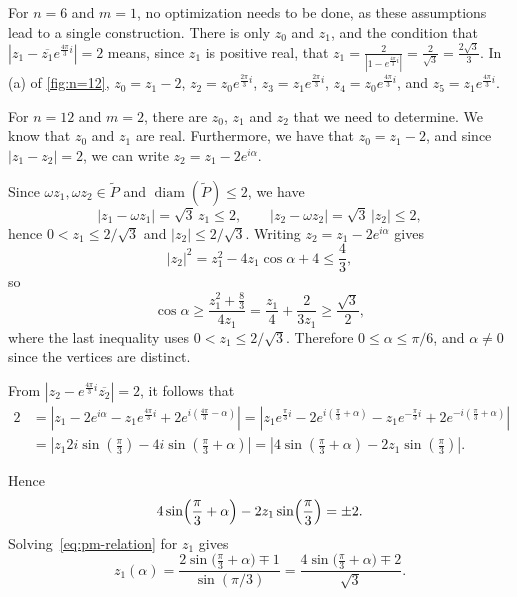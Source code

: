 \documentclass{article}
\DeclareMathOperator{\diam}{diam}
\theoremstyle{definition}
\let\le\leqslant
\let\ge\geqslant
\begin{document}
For \(n=6\) and \(m=1\), no optimization needs to be done, as these assumptions lead to a single construction.
There is only \(z_0\) and \(z_1\), and the condition that \(|z_1-\overline{z_1} e^{\frac{4\pi}3 i}|=2\) means, since \(z_1\) is positive real, that \(z_1= \frac{2}{|1-e^{\frac{4\pi}3 i}|}=\frac{2}{\sqrt{3}} =\frac{2\sqrt{3}}{3}\).
In (a) of \cref{fig:n=12}, \(z_0= z_1-2 \), \(z_2=z_0 e^{\frac{2\pi}3 i}\), \(z_3=z_1 e^{\frac{2\pi}3 i}\), \(z_4=z_0 e^{\frac{4\pi}3 i}\), and \(z_5=z_1 e^{\frac{4\pi}3 i}\).


For \(n=12\) and \(m=2\), there are \(z_0\), \(z_1\) and \(z_2\) that we need to determine.
We know that \(z_0\) and \(z_1\) are real.
Furthermore, we have that \(z_0=z_1-2\), and since \(|z_1-z_2|=2\), we can write \(z_2=z_1 - 2 e^{i\alpha}\).


Since $\omega z_1,\omega z_2\in\widetilde P$ and $\diam(\widetilde P)\le 2$, we have
\[
|z_1-\omega z_1|=\sqrt3\,z_1\le 2,\qquad |z_2-\omega z_2|=\sqrt3\,|z_2|\le 2,
\]
hence $0<z_1\le 2/\sqrt3$ and $|z_2|\le 2/\sqrt3$.
Writing $z_2=z_1-2e^{i\alpha}$ gives
\[
|z_2|^2=z_1^2-4z_1\cos\alpha+4\le \frac{4}{3},
\]
so
\[
\cos\alpha \ge \frac{z_1^2+\frac{8}{3}}{4z_1}=\frac{z_1}{4}+\frac{2}{3z_1}
\ge \frac{\sqrt3}{2},
\]
where the last inequality uses $0<z_1\le 2/\sqrt3$.
Therefore $0\le \alpha\le \pi/6$, and $\alpha\neq 0$ since the vertices are distinct.



From \(|z_2-e^{\frac{4\pi}3 i} \overline{z_2}|=2\), it follows that 
\begin{align*}
2&=\left|z_1-2e^{i\alpha} - z_1 e^{\frac{4\pi}3 i} +2 e^{i\left(\frac{4\pi}3-\alpha\right)}\right|=\left|z_1 e^{\frac{\pi}3 i} -2e^{i\left(\frac{\pi}3+\alpha\right)} - z_1 e^{-\frac{\pi}3 i} +2 e^{-i\left(\frac{\pi}3+\alpha\right)}\right|\\
&=\left|z_1 2i \sin\left(\frac{\pi}3\right) - 4i  \sin \left(\frac{\pi}3+\alpha\right)\right|=\left|4 \sin \left(\frac{\pi}3+\alpha\right)-2 z_1 \sin\left(\frac{\pi}3\right)\right|.
\end{align*}



Hence
\begin{equation}\label{eq:pm-relation}
4\sin\Bigl(\frac{\pi}{3}+\alpha\Bigr)-2z_1\sin\Bigl(\frac{\pi}{3}\Bigr)=\pm 2.
\end{equation}
Solving~\eqref{eq:pm-relation} for $z_1$ gives
\begin{equation}\label{eq:z1-of-alpha-pm}
z_1(\alpha)=\frac{2\sin\bigl(\frac{\pi}{3}+\alpha\bigr)\mp 1}{\sin(\pi/3)}
=\frac{4\sin\bigl(\frac{\pi}{3}+\alpha\bigr)\mp 2}{\sqrt3}.
\end{equation}
\end{document}
